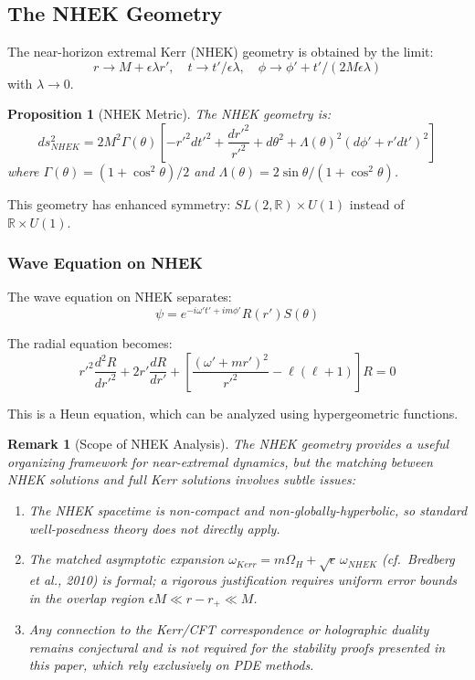\documentclass[12pt,a4paper]{article}
\newtheorem{proposition}[theorem]{Proposition}
\newtheorem{remark}[theorem]{Remark}
\begin{document}
\subsection{The NHEK Geometry}

The near-horizon extremal Kerr (NHEK) geometry is obtained by the limit:
\begin{equation}
r \to M + \epsilon \lambda r', \quad t \to t'/\epsilon \lambda, \quad \phi \to \phi' + t'/(2M\epsilon\lambda)
\end{equation}
with $\lambda \to 0$.

\begin{proposition}[NHEK Metric]
The NHEK geometry is:
\begin{equation}
ds^2_{NHEK} = 2M^2\Gamma(\theta)\left[-r'^2 dt'^2 + \frac{dr'^2}{r'^2} + d\theta^2 + \Lambda(\theta)^2(d\phi' + r' dt')^2\right]
\end{equation}
where $\Gamma(\theta) = (1 + \cos^2\theta)/2$ and $\Lambda(\theta) = 2\sin\theta/(1+\cos^2\theta)$.
\end{proposition}

This geometry has enhanced symmetry: $SL(2,\mathbb{R}) \times U(1)$ instead of $\mathbb{R} \times U(1)$.

\subsubsection{Wave Equation on NHEK}

The wave equation on NHEK separates:
\begin{equation}
\psi = e^{-i\omega' t' + im\phi'} R(r') S(\theta)
\end{equation}

The radial equation becomes:
\begin{equation}
r'^2 \frac{d^2R}{dr'^2} + 2r'\frac{dR}{dr'} + \left[\frac{(\omega' + mr')^2}{r'^2} - \ell(\ell+1)\right]R = 0
\end{equation}

This is a Heun equation, which can be analyzed using hypergeometric functions.

\begin{remark}[Scope of NHEK Analysis]
The NHEK geometry provides a useful organizing framework for near-extremal dynamics, but the matching between NHEK solutions and full Kerr solutions involves subtle issues:
\begin{enumerate}
\item The NHEK spacetime is non-compact and non-globally-hyperbolic, so standard well-posedness theory does not directly apply.
\item The matched asymptotic expansion $\omega_{Kerr} = m\Omega_H + \sqrt{\epsilon}\,\omega_{NHEK}$ (cf.\ Bredberg et al., 2010) is formal; a rigorous justification requires uniform error bounds in the overlap region $\epsilon M \ll r - r_+ \ll M$.
\item Any connection to the Kerr/CFT correspondence or holographic duality remains conjectural and is not required for the stability proofs presented in this paper, which rely exclusively on PDE methods.
\end{enumerate}
\end{remark}
\end{document}
